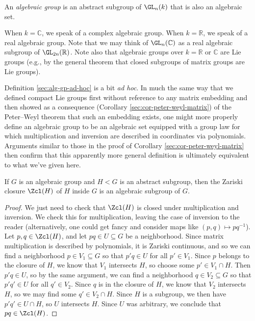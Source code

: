 \documentclass[reqno]{amsart} 
\begin{document}
\begin{definition}\label{sec:alg-gp-ad-hoc}
  An \emph{algebraic group} is an abstract subgroup of $\GL_n(k)$ that is also an algebraic set.
\end{definition}
When $k = \mathbb{C}$, we speak of a complex algebraic group.  When $k = \mathbb{R}$, we speak of a real algebraic group.  Note that we may think of $\GL_n(\mathbb{C})$ as a real algebraic subgroup of $\GL_{2n}(\mathbb{R})$.  Note also that algebraic groups over $k = \mathbb{R}$ or $\mathbb{C}$ are Lie groups (e.g., by the general theorem that closed subgroups of matrix groups are Lie groups).

Definition \ref{sec:alg-gp-ad-hoc} is a bit \emph{ad hoc}.  In much the same way that we defined compact Lie groups first without reference to any matrix embedding and then showed as a consequence (Corollary \ref{sec:cor-peter-weyl-matrix}) of the Peter--Weyl theorem that such an embedding exists, one might more properly define an algebraic group to be an algebraic set equipped with a group law for which multiplication and inversion are described in coordinates via polynomials.  Arguments similar to those in the proof of Corollary \ref{sec:cor-peter-weyl-matrix} then confirm that this apparently more general definition is ultimately equivalent to what we've given here.

\begin{lemma}\label{lem:zcl-gp-alg}
  If $G$ is an algebraic group and $H < G$ is an abstract subgroup, then the Zariski closure $\Zcl(H)$ of $H$ inside $G$ is an algebraic subgroup of $G$.
\end{lemma}
\begin{proof}
  We just need to check that $\Zcl(H)$ is closed under multiplication and inversion.  We check this for multiplication, leaving the case of inversion to the reader (alternatively, one could get fancy and consider maps like $(p,q) \mapsto p q^{-1}$).  Let $p,q \in \Zcl(H)$, and let $p q \in U \subseteq G$ be a neighborhood.  Since matrix multiplication is described by polynomials, it is Zariski continuous, and so we can find a neighborhood $p \in V_1 \subseteq G$ so that $p' q \in U$ for all $p' \in V_1$.  Since $p$ belongs to the closure of $H$, we know that $V_1$ intersects $H$, so choose some $p' \in V_1 \cap H$.  Then $p' q \in U$, so by the same argument, we can find a neighborhood $q \in V_2 \subseteq G$ so that $p' q' \in U$ for all $q' \in V_2$.  Since $q$ is in the closure of $H$, we know that $V_2$ intersects $H$, so we may find some $q' \in V_2 \cap H$.  Since $H$ is a subgroup, we then have $p' q' \in U \cap H$, so $U$ intersects $H$.  Since $U$ was arbitrary, we conclude that $p q \in \Zcl(H)$.
\end{proof}
\end{document}
